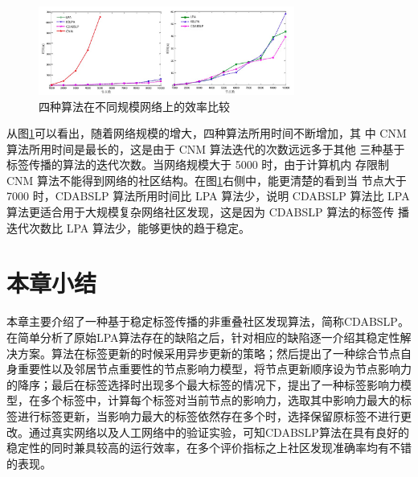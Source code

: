 \begin{figure}
  \centering
  \includegraphics[width=0.75\textwidth]{figures/butongguimowangluobijiao}
  \caption{四种算法在不同规模网络上的效率比较}\label{fig:butongguimowangluobijiao}
\end{figure}

从图\ref{fig:butongguimowangluobijiao}可以看出，随着网络规模的增大，四种算法所用时间不断增加，其
中 CNM 算法所用时间是最长的，这是由于 CNM 算法迭代的次数远远多于其他
三种基于标签传播的算法的迭代次数。当网络规模大于 5000 时，由于计算机内
存限制 CNM 算法不能得到网络的社区结构。在图\ref{fig:butongguimowangluobijiao}右侧中，能更清楚的看到当
节点大于 7000 时，CDABSLP 算法所用时间比 LPA 算法少，说明 CDABSLP 算法比
LPA 算法更适合用于大规模复杂网络社区发现，这是因为 CDABSLP 算法的标签传
播迭代次数比 LPA 算法少，能够更快的趋于稳定。 




\section{本章小结}

本章主要介绍了一种基于稳定标签传播的非重叠社区发现算法，简称CDABSLP。在简单分析了原始LPA算法存在的缺陷之后，针对相应的缺陷逐一介绍其稳定性解决方案。算法在标签更新的时候采用异步更新的策略；然后提出了一种综合节点自身重要性以及邻居节点重要性的节点影响力模型，将节点更新顺序设为节点影响力的降序；最后在标签选择时出现多个最大标签的情况下，提出了一种标签影响力模型，在多个标签中，计算每个标签对当前节点的影响力，选取其中影响力最大的标签进行标签更新，当影响力最大的标签依然存在多个时，选择保留原标签不进行更改。通过真实网络以及人工网络中的验证实验，可知CDABSLP算法在具有良好的稳定性的同时兼具较高的运行效率，在多个评价指标之上社区发现准确率均有不错的表现。
